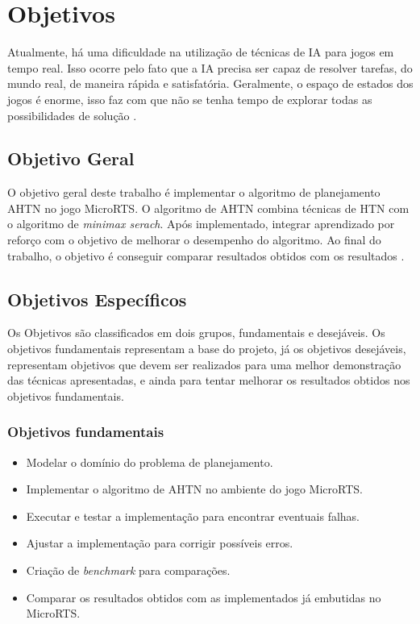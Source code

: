 \chapter{\label{chap:obje}Objetivos}

Atualmente, há uma dificuldade na utilização de técnicas de IA para jogos em tempo real. Isso ocorre pelo fato que a IA precisa ser capaz de resolver tarefas, do mundo real, de maneira rápida e satisfatória. Geralmente, o espaço de estados dos jogos é enorme, isso faz com que não se tenha tempo de explorar todas as possibilidades de solução \cite{millington2009artificial}.   

\section{Objetivo Geral}
O objetivo geral deste trabalho é implementar o algoritmo de planejamento AHTN \cite{ontanon2015adversarial} no jogo MicroRTS. O algoritmo de AHTN combina técnicas de HTN com o algoritmo de \textit{minimax serach}. Após implementado, integrar aprendizado por reforço com o objetivo de melhorar o desempenho do algoritmo. Ao final do trabalho, o objetivo é conseguir comparar resultados obtidos com os resultados \cite{ontanon2012experiments,hogg2010learning,ontanon2013survey}. 

\section{Objetivos Específicos}\label{obj:esp}
Os Objetivos são classificados em dois grupos, fundamentais e desejáveis. Os objetivos fundamentais representam a base do projeto, já os objetivos desejáveis, representam objetivos que devem ser realizados para uma melhor demonstração das técnicas apresentadas, e ainda para tentar melhorar os resultados obtidos nos objetivos fundamentais. 
 
\subsection{Objetivos fundamentais} 
\begin{itemize}
	\item Modelar o domínio do problema de planejamento.
	\item Implementar o algoritmo de AHTN no ambiente do jogo MicroRTS.
	\item Executar e testar a implementação para encontrar eventuais falhas.
	\item Ajustar a implementação para corrigir possíveis erros.
	\item Criação de \textit{benchmark} para comparações.
	\item Comparar os resultados obtidos com as implementados já embutidas no MicroRTS.
\end{itemize}
 
